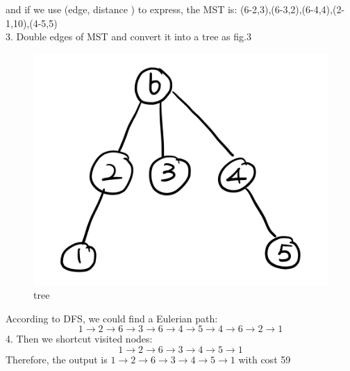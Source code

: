 \documentclass[a4paper,12pt]{journal}
\begin{document}
	and if we use (edge, distance ) to express, the MST is:
	(6-2,3),(6-3,2),(6-4,4),(2-1,10),(4-5,5)\\
	3. Double edges of MST and convert it into a tree as fig.3\\
	\begin{figure}[h]
		\includegraphics[scale=0.5]{./image/3.png}
		\caption{tree }
	\end{figure}
	According to DFS, we could find a Eulerian path:\\
		$$1\rightarrow2\rightarrow6\rightarrow3\rightarrow6\rightarrow4\rightarrow5\rightarrow4\rightarrow6\rightarrow2\rightarrow1$$
	4. Then we shortcut visited nodes:\\
		$$1\rightarrow2\rightarrow6\rightarrow3\rightarrow4\rightarrow5\rightarrow1$$
		Therefore, the output is $1\rightarrow2\rightarrow6\rightarrow3\rightarrow4\rightarrow5\rightarrow1$ with cost 59
\end{document}

